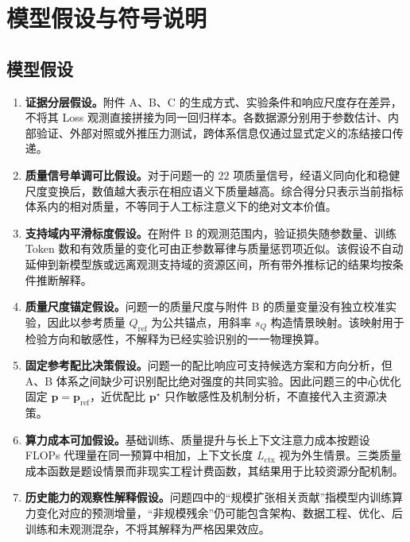 \section{模型假设与符号说明}

\subsection{模型假设}

\begin{enumerate}
    \item \textbf{证据分层假设。}附件 A、B、C 的生成方式、实验条件和响应尺度存在差异，不将其 Loss 观测直接拼接为同一回归样本。各数据源分别用于参数估计、内部验证、外部对照或外推压力测试，跨体系信息仅通过显式定义的冻结接口传递。

    \item \textbf{质量信号单调可比假设。}对于问题一的 $22$ 项质量信号，经语义同向化和稳健尺度变换后，数值越大表示在相应语义下质量越高。综合得分只表示当前指标体系内的相对质量，不等同于人工标注意义下的绝对文本价值。

    \item \textbf{支持域内平滑标度假设。}在附件 B 的观测范围内，验证损失随参数量、训练 Token 数和有效质量的变化可由正参数幂律与质量惩罚项近似。该假设不自动延伸到新模型族或远离观测支持域的资源区间，所有带外推标记的结果均按条件推断解释。

    \item \textbf{质量尺度锚定假设。}问题一的质量尺度与附件 B 的质量变量没有独立校准实验，因此以参考质量 $Q_{\mathrm{ref}}$ 为公共锚点，用斜率 $s_Q$ 构造情景映射。该映射用于检验方向和敏感性，不解释为已经实验识别的一一物理换算。

    \item \textbf{固定参考配比决策假设。}问题一的配比响应可支持候选方案和方向分析，但 A、B 体系之间缺少可识别配比绝对强度的共同实验。因此问题三的中心优化固定 $\boldsymbol p=\boldsymbol p_{\mathrm{ref}}$，近优配比 $\boldsymbol p^\star$ 只作敏感性及机制分析，不直接代入主资源决策。

    \item \textbf{算力成本可加假设。}基础训练、质量提升与长上下文注意力成本按题设 FLOPs 代理量在同一预算中相加，上下文长度 $L_{\mathrm{ctx}}$ 视为外生情景。三类质量成本函数是题设情景而非现实工程计费函数，其结果用于比较资源分配机制。

    \item \textbf{历史能力的观察性解释假设。}问题四中的“规模扩张相关贡献”指模型内训练算力变化对应的预测增量，“非规模残余”仍可能包含架构、数据工程、优化、后训练和未观测混杂，不将其解释为严格因果效应。
\end{enumerate}

